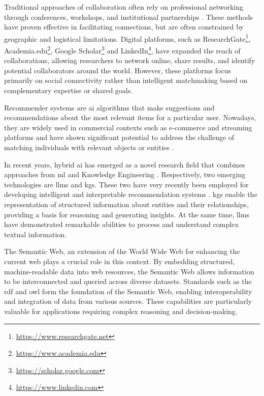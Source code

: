 Traditional approaches of collaboration often rely on professional networking through conferences, workshops, and institutional partnerships \cite{KATZ19971}.
These methods have proven effective in facilitating connections, but are often constrained by geographic and logistical limitations.
Digital platforms, such as ResearchGate\footnote{\url{https://www.researchgate.net}}, Academia.edu\footnote{\url{https://www.academia.edu}}, Google Scholar\footnote{\url{https://scholar.google.com}} and LinkedIn\footnote{\url{https://www.linkedin.com}}, have expanded the reach of collaborations, allowing researchers to network online, share results, and identify potential collaborators around the world.
However, these platforms focus primarily on social connectivity rather than intelligent matchmaking based on complementary expertise or shared goals.

Recommender systems \cite{Lu2012} are \gls{ai} algorithms that make suggestions and recommendations about the most relevant items for a particular user.
Nowadays, they are widely used in commercial contexts such as e-commerce and streaming platforms and have shown significant potential to address the challenge of matching individuals with relevant objects or entities \cite{Hussien2021}.

In recent years, hybrid \gls{ai} has emerged as a novel research field that combines approaches from \gls{ml} and Knowledge Engineering \cite{RordorfKCL23,PraterLaurenzi22,GarcezL23}.
Respectively, two emerging technologies are \glspl{llm} and \glspl{kg}.
These two have very recently been employed for developing intelligent and interpretable recommendation systems \cite{Zhao2024}.
\glspl{kg} enable the representation of structured information about entities and their relationships, providing a basis for reasoning and generating insights.
At the same time, \glspl{llm} have demonstrated remarkable abilities to process and understand complex textual information. 

The Semantic Web, an extension of the World Wide Web for enhancing the current web plays a crucial role in this context.
By embedding structured, machine-readable data into web resources, the Semantic Web allows information to be interconnected and queried across diverse datasets.
Standards such as the \gls{rdf} \cite{Cyganiak14RCA} and \gls{owl} \cite{Deborah2004} form the foundation of the Semantic Web, enabling interoperability and integration of data from various sources.
These capabilities are particularly valuable for applications requiring complex reasoning and decision-making.


